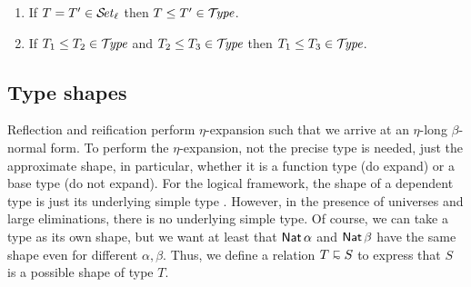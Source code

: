 \documentclass[acmlarge,review,anonymous]{acmart}\settopmatter{printfolios=true}
\begin{document}
\begin{lemma}
\label{lem:preord}
\bla
\begin{enumerate}
\item If\/ $T = T' \in \SET[\ell]$ then $T \leq T' \in \TYPE$.
\item If\/ $T_1 \leq T_2 \in \TYPE$ and $T_2 \leq T_3 \in \TYPE$ then $T_1 \leq T_3 \in \TYPE$.
\end{enumerate}
\end{lemma}





\subsection{Type shapes}
\label{sec:shape}

Reflection and reification perform $\eta$-expansion such that we arrive at an $\eta$-long $\beta$-normal form.  To perform the $\eta$-expansion, not the precise type is needed, just the approximate shape, in particular, whether it is a function type (do expand) or a base type (do not expand).
For the logical framework, the shape of a dependent type is just its underlying simple type \cite{harperPfenning:equivalenceLF}. However, in the presence of universes and large eliminations, there is no underlying simple type.  Of course, we can take a type as its own shape, but we want at least that $\Nat \alpha$ and $\Nat \beta$ have the same shape even for different $\alpha, \beta$.  Thus, we define a relation $T \shape S$ to express that $S$ is a possible shape of type $T$.
\end{document}
